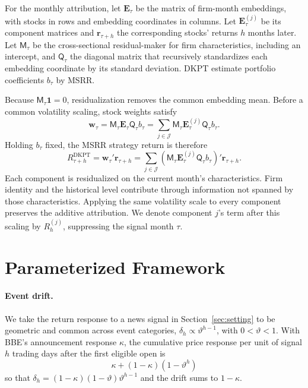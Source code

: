 \documentclass[11pt,letterpaper]{article}
\theoremstyle{remark}
\begin{document}
For the monthly attribution, let $\mathbf E_\tau$ be the matrix of firm-month embeddings, with stocks in rows and embedding coordinates in columns. Let $\mathbf E_\tau^{(j)}$ be its component matrices and $\mathbf r_{\tau+h}$ the corresponding stocks' returns $h$ months later. Let $\mathsf M_\tau$ be the cross-sectional residual-maker for firm characteristics, including an intercept, and $\mathsf Q_\tau$ the diagonal matrix that recursively standardizes each embedding coordinate by its standard deviation. DKPT estimate portfolio coefficients $b_\tau$ by MSRR.

Because $\mathsf M_\tau\mathbf 1=0$, residualization removes the common embedding mean. Before a common volatility scaling, stock weights satisfy
\[
\mathbf w_\tau
=
\mathsf M_\tau\mathbf E_\tau\mathsf Q_\tau b_\tau
=
\sum_{j\in\mathcal J}
\mathsf M_\tau\mathbf E_\tau^{(j)}\mathsf Q_\tau b_\tau.
\]
Holding $b_\tau$ fixed, the MSRR strategy return is therefore
\[
R_{\tau+h}^{\mathrm{DKPT}}
=
\mathbf w_\tau'\mathbf r_{\tau+h}
=
\sum_{j\in\mathcal J}
\left(
\mathsf M_\tau\mathbf E_\tau^{(j)}\mathsf Q_\tau b_\tau
\right)'\mathbf r_{\tau+h}.
\]
Each component is residualized on the current month's characteristics. Firm identity and the historical level contribute through information not spanned by those characteristics. Applying the same volatility scale to every component preserves the additive attribution. We denote component $j$'s term after this scaling by $R_h^{(j)}$, suppressing the signal month $\tau$.

\section{Parameterized Framework}\label{sec:param}

\paragraph{Event drift.}
We take the return response to a news signal in Section~\ref{sec:setting} to be geometric and common across event categories, $\delta_h\propto\vartheta^{h-1}$, with $0<\vartheta<1$. With BBE's announcement response $\kappa$, the cumulative price response per unit of signal $h$ trading days after the first eligible open is
\begin{equation}\label{eq:D1}
\kappa+(1-\kappa)\left(1-\vartheta^h\right)
\end{equation}
so that $\delta_h=(1-\kappa)(1-\vartheta)\vartheta^{h-1}$ and the drift sums to $1-\kappa$.
\end{document}

